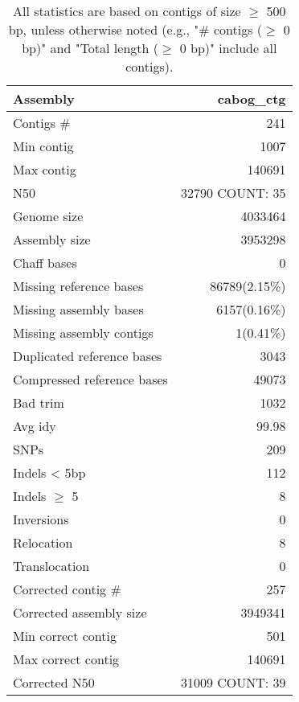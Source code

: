 \documentclass[12pt,a4paper]{article}
\begin{document}
\begin{table}[ht]
\begin{center}
\caption{All statistics are based on contigs of size $\geq$ 500 bp, unless otherwise noted (e.g., "\# contigs ($\geq$ 0 bp)" and "Total length ($\geq$ 0 bp)" include all contigs).}
\begin{tabular}{|l*{1}{|r}|}
\hline
Assembly & cabog\_ctg \\ \hline
Contigs \# & 241 \\ \hline
Min contig & 1007 \\ \hline
Max contig & 140691 \\ \hline
N50 & 32790 COUNT: 35 \\ \hline
Genome size & 4033464 \\ \hline
Assembly size & 3953298 \\ \hline
Chaff bases & 0 \\ \hline
Missing reference bases & 86789(2.15\%) \\ \hline
Missing assembly bases & 6157(0.16\%) \\ \hline
Missing assembly contigs & 1(0.41\%) \\ \hline
Duplicated reference bases & 3043 \\ \hline
Compressed reference bases & 49073 \\ \hline
Bad trim & 1032 \\ \hline
Avg idy & 99.98 \\ \hline
SNPs & 209 \\ \hline
Indels < 5bp & 112 \\ \hline
Indels $\geq$ 5 & 8 \\ \hline
Inversions & 0 \\ \hline
Relocation & 8 \\ \hline
Translocation & 0 \\ \hline
Corrected contig \# & 257 \\ \hline
Corrected assembly size & 3949341 \\ \hline
Min correct contig & 501 \\ \hline
Max correct contig & 140691 \\ \hline
Corrected N50 & 31009 COUNT: 39 \\ \hline
\end{tabular}
\end{center}
\end{table}
\end{document}
